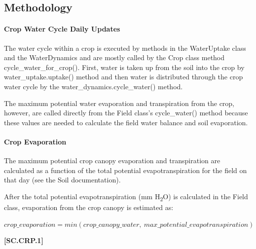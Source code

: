\subsection{Methodology}

\paragraph{Crop Water Cycle Daily Updates}
\vspace{-0.25cm}
The water cycle within a crop is executed by methods in the WaterUptake class and the WaterDynamics and are mostly called by the Crop class method cycle\_water\_for\_crop(). First, water is taken up from the soil into the crop by water\_uptake.uptake() method and then water is distributed through the crop water cycle by the water\_dynamics.cycle\_water() method. 

The maximum potential water evaporation and transpiration from the crop, however, are called directly from the Field class’s cycle\_water() method because these values are needed to calculate the field water balance and soil evaporation. 
\vspace{0.5cm}


\paragraph{Crop Evaporation}
\vspace{-0.25cm}

The maximum potential crop canopy evaporation and transpiration are calculated as a function of the total potential evapotranspiration for the field on that day (see the Soil documentation). 

After the total potential evapotranspiration (mm H\textsubscript{2}O) is calculated in the Field class, evaporation from the crop canopy is estimated as: 



\vspace{0.2cm}

    \begin{center}
        \(crop\_evaporation = min(crop\_canopy\_water,\ max\_potential\_evapotranspiration) \)
    \end{center}
        \vspace{0.5cm}
    
            {\raggedleft \textbf{[SC.CRP.1]}\par}
            \vspace{0.5cm}

